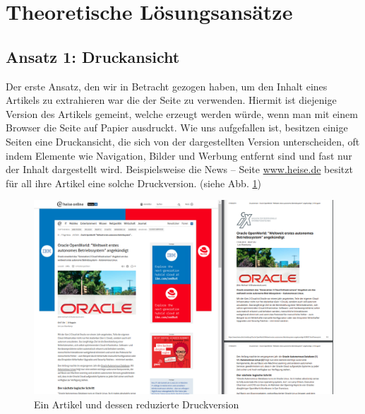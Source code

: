 \section{Theoretische Lösungsansätze}
\subsection[Die reduzierte Druckansicht]{Ansatz 1: Druckansicht}%
\label{extractor:ansatz:subsec1}
Der erste Ansatz, den wir in Betracht gezogen haben, um den Inhalt eines Artikels zu extrahieren war die  der Seite zu verwenden. Hiermit ist diejenige Version des Artikels gemeint, welche erzeugt werden würde, wenn man mit einem Browser die Seite auf Papier ausdruckt. Wie uns aufgefallen ist, besitzen einige Seiten eine Druckansicht, die sich von der dargestellten Version unterscheiden, oft indem Elemente wie Navigation, Bilder und Werbung entfernt sind und fast nur der Inhalt dargestellt wird. Beispielsweise die News – Seite \url{www.heise.de} besitzt für all ihre Artikel eine solche Druckversion. (siehe Abb. \ref{extractor:image:druckansicht})

\begin{figure}[t]
	\centering
	\includegraphics[width=\linewidth]{images/druckansicht.png}
	\caption{Ein Artikel und dessen reduzierte Druckversion}
	\label{extractor:image:druckansicht}
\end{figure}

